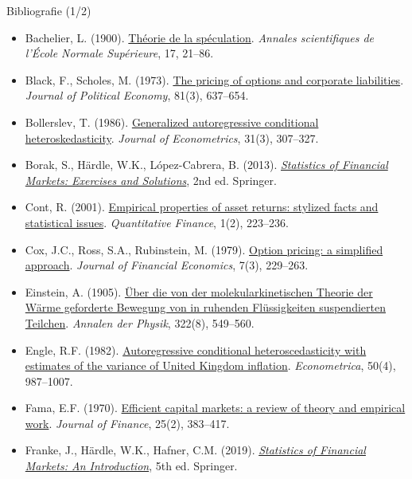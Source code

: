 \begin{frame}{Bibliografie (1/2)}
\itemsize{\tiny}
\begin{itemize}
    \item Bachelier, L. (1900). \href{https://doi.org/10.24033/asens.476}{Théorie de la spéculation}. \textit{Annales scientifiques de l'École Normale Supérieure}, 17, 21--86.
    \item Black, F., Scholes, M. (1973). \href{https://doi.org/10.1086/260062}{The pricing of options and corporate liabilities}. \textit{Journal of Political Economy}, 81(3), 637--654.
    \item Bollerslev, T. (1986). \href{https://doi.org/10.1016/0304-4076(86)90063-1}{Generalized autoregressive conditional heteroskedasticity}. \textit{Journal of Econometrics}, 31(3), 307--327.
    \item Borak, S., Härdle, W.K., López-Cabrera, B. (2013). \href{https://doi.org/10.1007/978-3-642-33929-5}{\textit{Statistics of Financial Markets: Exercises and Solutions}}, 2nd ed. Springer.
    \item Cont, R. (2001). \href{https://doi.org/10.1080/713665670}{Empirical properties of asset returns: stylized facts and statistical issues}. \textit{Quantitative Finance}, 1(2), 223--236.
    \item Cox, J.C., Ross, S.A., Rubinstein, M. (1979). \href{https://doi.org/10.1016/0304-405X(79)90015-1}{Option pricing: a simplified approach}. \textit{Journal of Financial Economics}, 7(3), 229--263.
    \item Einstein, A. (1905). \href{https://doi.org/10.1002/andp.19053220806}{Über die von der molekularkinetischen Theorie der Wärme geforderte Bewegung von in ruhenden Flüssigkeiten suspendierten Teilchen}. \textit{Annalen der Physik}, 322(8), 549--560.
    \item Engle, R.F. (1982). \href{https://doi.org/10.2307/1912773}{Autoregressive conditional heteroscedasticity with estimates of the variance of United Kingdom inflation}. \textit{Econometrica}, 50(4), 987--1007.
    \item Fama, E.F. (1970). \href{https://doi.org/10.2307/2325486}{Efficient capital markets: a review of theory and empirical work}. \textit{Journal of Finance}, 25(2), 383--417.
    \item Franke, J., Härdle, W.K., Hafner, C.M. (2019). \href{https://doi.org/10.1007/978-3-030-13751-9}{\textit{Statistics of Financial Markets: An Introduction}}, 5th ed. Springer.
\end{itemize}
\end{frame}


